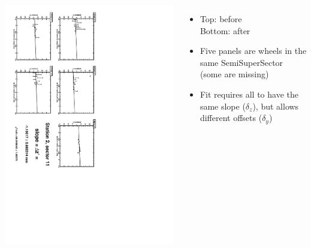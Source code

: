 \documentclass[compress]{beamer}
\begin{document}
\begin{frame}
\begin{columns}
\vfill
\includegraphics[height=\linewidth, angle=90]{zfits_after/zfit_2_11.pdf}
\begin{itemize}
\item Top: before \\ Bottom: after
\item Five panels are wheels in the same SemiSuperSector (some are missing)
\item Fit requires all to have the same slope ($\delta_z$), but allows different offsets ($\delta_y$)
\end{itemize}
\end{columns}
\end{frame}
\end{document}

